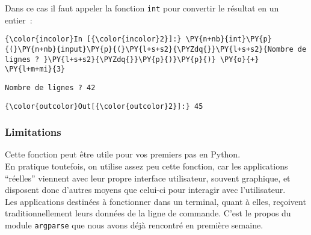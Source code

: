     \begin{Shaded}
\begin{Highlighting}[]
\OperatorTok{>>>} \NormalTok{(}\NormalTok{) }\OperatorTok{+} 
\NormalTok{, } \OperatorTok{<}\OperatorTok{>}
\NormalTok{, } 
\end{Highlighting}
\end{Shaded}

    Dans ce cas il faut appeler la fonction \texttt{int} pour convertir le
résultat en un entier~:

    \begin{Verbatim}[commandchars=\\\{\}]
{\color{incolor}In [{\color{incolor}2}]:} \PY{n+nb}{int}\PY{p}{(}\PY{n+nb}{input}\PY{p}{(}\PY{l+s+s2}{\PYZdq{}}\PY{l+s+s2}{Nombre de lignes ? }\PY{l+s+s2}{\PYZdq{}}\PY{p}{)}\PY{p}{)} \PY{o}{+} \PY{l+m+mi}{3}
\end{Verbatim}


    \begin{Verbatim}[commandchars=\\\{\}]
Nombre de lignes ? 42

    \end{Verbatim}

\begin{Verbatim}[commandchars=\\\{\}]
{\color{outcolor}Out[{\color{outcolor}2}]:} 45
\end{Verbatim}
            
    \hypertarget{limitations}{%
\subsubsection{Limitations}\label{limitations}}

    Cette fonction peut être utile pour vos premiers pas en Python.\\

En pratique toutefois, on utilise assez peu cette fonction, car les
applications ``réelles'' viennent avec leur propre interface
utilisateur, souvent graphique, et disposent donc d'autres moyens que
celui-ci pour interagir avec l'utilisateur.\\

Les applications destinées à fonctionner dans un terminal, quant à
elles, reçoivent traditionnellement leurs données de la ligne de
commande. C'est le propos du module \texttt{argparse} que nous avons
déjà rencontré en première semaine.